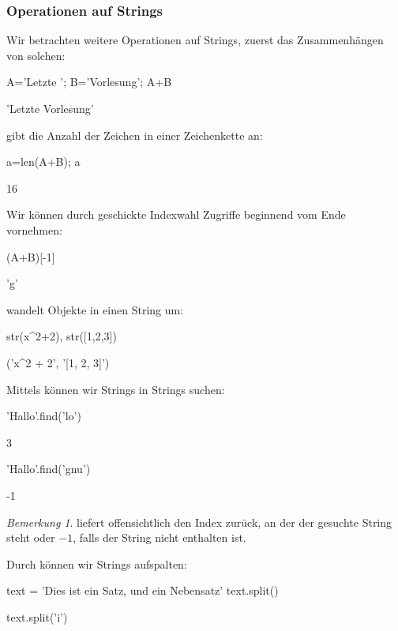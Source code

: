 \documentclass[fontsize=12pt,paper=a4,twoside,bibtotoc,idxtotoc,
liststotoc,pagesize,BCOR1.2cm,DIV15,chapterprefix,pagesize=pdftex]{scrbook}
\theoremstyle{plain}
\theoremstyle{definition}
\theoremstyle{remark}
\newtheorem{bem}[equation]{Bemerkung}
\begin{document}
\subsubsection{Operationen auf Strings}
Wir betrachten weitere Operationen auf Strings, zuerst das Zusammenhängen von solchen:
\begin{sagein}
A='Letzte '; B='Vorlesung'; A+B
\end{sagein}
\begin{sageout}
'Letzte Vorlesung'
\end{sageout}
  gibt die Anzahl der Zeichen in einer Zeichenkette
an:
\begin{sagein}
a=len(A+B); a
\end{sagein}
\begin{sageout}
  16
\end{sageout}
Wir können durch geschickte Indexwahl Zugriffe beginnend vom Ende vornehmen:
\begin{sagein}
(A+B)[-1]
\end{sagein}
\begin{sageout}
  'g'
\end{sageout}
 {\color{blue} } wandelt Objekte in einen String um:
\begin{sagein}
str(x^2+2), str([1,2,3])
\end{sagein}
\begin{sageout}
('x^2 + 2', '[1, 2, 3]')
\end{sageout}
Mittels {\color{blue} } können wir Strings in Strings suchen:
\begin{sagein}
'Hallo'.find('lo')
\end{sagein}
\begin{sageout}
3
\end{sageout}
 \begin{sagein}
'Hallo'.find('gnu')
\end{sagein}
\begin{sageout}
-1
\end{sageout}
\begin{bem}
  liefert offensichtlich den Index zurück, an der der gesuchte String steht oder $-1$, falls der String nicht 
enthalten ist.
\end{bem}
Durch {\color{blue} } können wir Strings aufspalten:
\begin{sagein}
text = 'Dies ist ein Satz, und ein Nebensatz'
text.split() 
\end{sagein}
\begin{sageout}
\end{sageout}
\begin{sagein}
text.split('i')
\end{sagein}
\begin{sageout}
\end{sageout}
\end{document}
